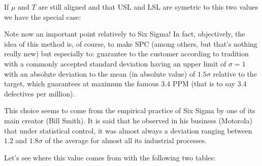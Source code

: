 	If $\mu$ and $T$ are still aligned and that USL and LSL are symetric to this two values we have the special case:
	
Note now an important point relatively to Six Sigma! In fact, objectively, the idea of this method is, of course, to make SPC (among others, but that's nothing really new) but especially to: guarantee to the customer according to tradition with a commonly accepted standard deviation having an upper limit of $\sigma=1$ with an absolute deviation to the mean (in absolute value) of $1.5\sigma$ relative to the target, which guarantees at maximum the famous 3.4 PPM (that is to say 3.4 defectives per million).	

	\begin{tcolorbox}[title=Remark,colframe=black,arc=10pt]
	This choice seems to come from the empirical practice of Six Sigma by one of its main creator (Bill Smith). It is said that he observed in his business (Motorola) that under statistical control, it was almost always a deviation ranging between $1.2$ and $1.8\sigma$ of the average for almost all its industrial processes.
	\end{tcolorbox}
	Let's see where this value comes from with the following two tables:
